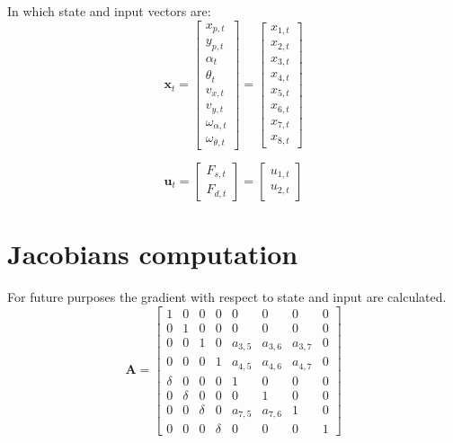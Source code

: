 In which state and input vectors are: 
\[ \textbf{x}_t = \begin{bmatrix} x_{p,t} \\ y_{p,t} \\ \alpha_t \\ \theta_t \\ v_{x,t} \\ v_{y,t} \\ \omega_{\alpha,t} \\ \omega_{\theta,t} \end{bmatrix} = \begin{bmatrix}   x_{1,t} \\ x_{2,t} \\ x_{3,t} \\ x_{4,t} \\ x_{5,t} \\ x_{6,t} \\ x_{7,t} \\ x_{8,t} \end{bmatrix} \]

\[ \textbf{u}_t = \begin{bmatrix} F_{s,t} \\ F_{d,t} \end{bmatrix} = \begin{bmatrix}   u_{1,t} \\ u_{2,t} \end{bmatrix} \]



\section{Jacobians computation}
For future purposes the gradient with respect to state and input are calculated.
\[
\textbf{A}
=
\begin{bmatrix}
    1 & 0 & 0 & 0 & 0 & 0 & 0 & 0 \\
    0 & 1 & 0 & 0 & 0 & 0 & 0 & 0 \\
    0 & 0 & 1 & 0 & a_{3,5} & a_{3,6} & a_{3,7} & 0 \\
    0 & 0 & 0 & 1 & a_{4,5} & a_{4,6} & a_{4,7} & 0 \\
    \delta  & 0  & 0 & 0 & 1 & 0 & 0 & 0 \\
    0 & \delta & 0 & 0 & 0 & 1 & 0 & 0 \\
    0 & 0 & \delta & 0 & a_{7,5} & a_{7,6} & 1 & 0 \\
    0 & 0 & 0 & \delta & 0 & 0 & 0 & 1 
\end{bmatrix}
\]

